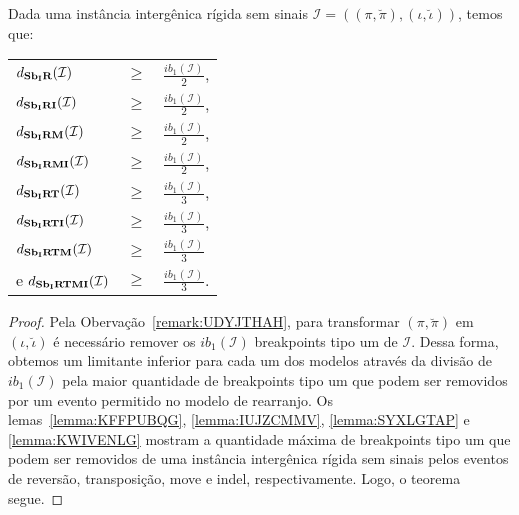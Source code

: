 \begin{theorem}\label{theorem:MPFPKHQO}
Dada uma instância intergênica rígida sem sinais $\mathcal{I}=((\pi,\breve\pi),(\iota,\breve\iota))$, temos que:

\begin{tabular}{lll}
  $d_{\textbf{Sb\textsubscript{I}R}}(\mathcal{I})$      & $ \ge $ & $\frac{ib_1(\mathcal{I})}{2}$, \\ 
  $d_{\textbf{Sb\textsubscript{I}RI}}(\mathcal{I})$     & $ \ge $ & $\frac{ib_1(\mathcal{I})}{2}$, \\
  $d_{\textbf{Sb\textsubscript{I}RM}}(\mathcal{I})$     & $ \ge $ & $\frac{ib_1(\mathcal{I})}{2}$, \\
  $d_{\textbf{Sb\textsubscript{I}RMI}}(\mathcal{I})$    & $ \ge $ & $\frac{ib_1(\mathcal{I})}{2}$, \\
  $d_{\textbf{Sb\textsubscript{I}RT}}(\mathcal{I})$     & $ \ge $ & $\frac{ib_1(\mathcal{I})}{3}$, \\
  $d_{\textbf{Sb\textsubscript{I}RTI}}(\mathcal{I})$    & $ \ge $ & $\frac{ib_1(\mathcal{I})}{3}$, \\
  $d_{\textbf{Sb\textsubscript{I}RTM}}(\mathcal{I})$    & $ \ge $ & $\frac{ib_1(\mathcal{I})}{3}$  \\
  e $d_{\textbf{Sb\textsubscript{I}RTMI}}(\mathcal{I})$ & $ \ge $ & $\frac{ib_1(\mathcal{I})}{3}$. \\
\end{tabular}
\end{theorem}
\begin{proof}
Pela Obervação~\ref{remark:UDYJTHAH}, para transformar $(\pi,\breve\pi)$ em $(\iota,\breve\iota)$ é necessário remover os $ib_1(\mathcal{I})$ breakpoints tipo um de $\mathcal{I}$. Dessa forma, obtemos um limitante inferior para cada um dos modelos através da divisão de $ib_1(\mathcal{I})$ pela maior quantidade de breakpoints tipo um que podem ser removidos por um evento permitido no modelo de rearranjo. Os lemas~\ref{lemma:KFFPUBQG}, \ref{lemma:IUJZCMMV}, \ref{lemma:SYXLGTAP} e \ref{lemma:KWIVENLG} mostram a quantidade máxima de breakpoints tipo um que podem ser removidos de uma instância intergênica rígida sem sinais pelos eventos de reversão, transposição, move e indel, respectivamente. Logo, o teorema segue.
\end{proof}

